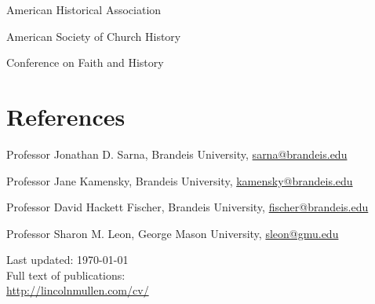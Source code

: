 \documentclass[11pt]{article}
\begin{document}
American Historical Association

American Society of Church History

Conference on Faith and History

\section{References}

Professor Jonathan D. Sarna, Brandeis University,
\href{mailto:sarna@brandeis.edu}{sarna@brandeis.edu}

Professor Jane Kamensky, Brandeis University, 
\href{mailto:kamensky@brandeis.edu}{kamensky@brandeis.edu}

Professor David Hackett Fischer, Brandeis University, 
\href{mailto:fischer@brandeis.edu}{fischer@brandeis.edu}

Professor Sharon M. Leon, George Mason University,
\href{mailto:sleon@gmu.edu}{sleon@gmu.edu}

\vfill{}

\begin{center}
  {\scriptsize 
    Last updated: \today\\[.25cm]
    Full text of publications:\\
    \href{http://lincolnmullen.com/cv/}{http://lincolnmullen.com/cv/}\\[.1cm]
  }
\end{center}
\end{document}
